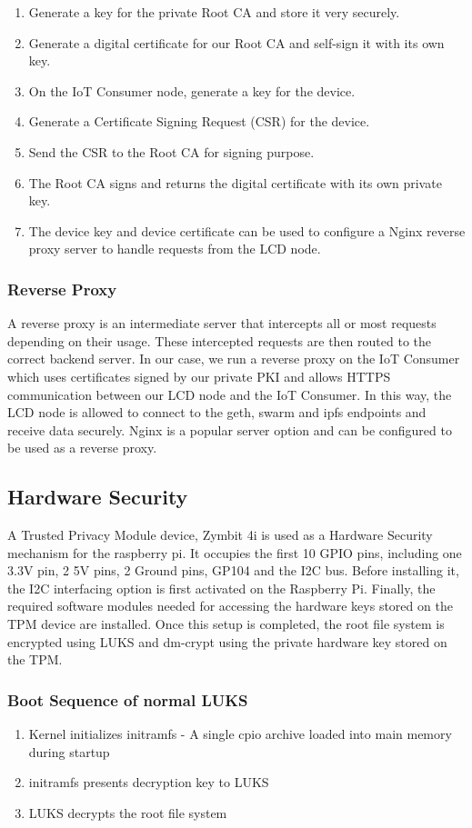 \documentclass[11pt,openright]{report}
\begin{document}
\begin{enumerate}
	\item Generate a key for the private Root CA and store it very securely.
	\item Generate a digital certificate for our Root CA and self-sign it with its own key.
	\item On the IoT Consumer node, generate a key for the device.
	\item Generate a Certificate Signing Request (CSR) for the device.
	\item Send the CSR to the Root CA for signing purpose.
	\item The Root CA signs and returns the digital certificate with its own private key.
	\item The device key and device certificate can be used to configure a Nginx reverse proxy server to handle requests from the LCD node.
\end{enumerate}


\subsubsection{Reverse Proxy}
A reverse proxy is an intermediate server that intercepts all or most requests depending on their usage. These intercepted requests are then routed to the correct backend server. In our case, we run a reverse proxy on the IoT Consumer which uses certificates signed by our private PKI and allows HTTPS communication between our LCD node and the IoT Consumer. In this way, the LCD node is allowed to connect to the geth, swarm and ipfs endpoints and receive data securely. Nginx is a popular server option and can be configured to be used as a reverse proxy.

\subsection{Hardware Security}
A Trusted Privacy Module device, Zymbit 4i is used as a Hardware Security mechanism for the raspberry pi. It occupies the first 10 GPIO pins, including one 3.3V pin, 2 5V pins, 2 Ground pins, GP104 and the I2C bus. Before installing it, the I2C interfacing option is first activated on the Raspberry Pi. Finally, the required software modules needed for accessing the hardware keys stored on the TPM device are installed. Once this setup is completed, the root file system is encrypted using LUKS and dm-crypt using the private hardware key stored on the TPM.

\subsubsection{Boot Sequence of normal LUKS}
\begin{enumerate}
	\item Kernel initializes initramfs - A single cpio archive loaded into main memory during startup
	\item initramfs presents decryption key to LUKS
	\item LUKS decrypts the root file system
\end{enumerate}
\end{document}
